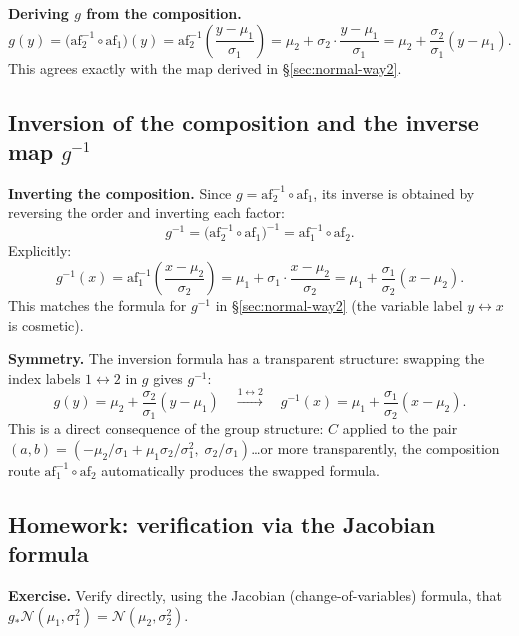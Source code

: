 \documentclass[11pt,a4paper]{article}
\newcommand{\N}{\mathcal{N}}
\begin{document}
\noindent\textbf{Deriving $g$ from the composition.}
\[
  g(y)
  = \bigl(\mathrm{af}_2^{-1}\circ\mathrm{af}_1\bigr)(y)
  = \mathrm{af}_2^{-1}\!\left(\frac{y-\mu_1}{\sigma_1}\right)
  = \mu_2 + \sigma_2\cdot\frac{y-\mu_1}{\sigma_1}
  = \mu_2 + \frac{\sigma_2}{\sigma_1}(y-\mu_1).
\]
This agrees exactly with the map derived in \S\ref{sec:normal-way2}. \checkmark

\subsection{Inversion of the composition and the inverse map $g^{-1}$}
\label{sec:g-inverse}

\noindent\textbf{Inverting the composition.}
Since $g=\mathrm{af}_2^{-1}\circ\mathrm{af}_1$, its inverse is obtained by reversing the
order and inverting each factor:
\[
  g^{-1}
  = \bigl(\mathrm{af}_2^{-1}\circ\mathrm{af}_1\bigr)^{-1}
  = \mathrm{af}_1^{-1}\circ\mathrm{af}_2.
\]
Explicitly:
\[
  g^{-1}(x)
  = \mathrm{af}_1^{-1}\!\left(\frac{x-\mu_2}{\sigma_2}\right)
  = \mu_1 + \sigma_1\cdot\frac{x-\mu_2}{\sigma_2}
  = \mu_1 + \frac{\sigma_1}{\sigma_2}(x-\mu_2).
\]
This matches the formula for $g^{-1}$ in \S\ref{sec:normal-way2} (the variable label
$y\leftrightarrow x$ is cosmetic). \checkmark

\noindent\textbf{Symmetry.}  The inversion formula has a transparent structure:
swapping the index labels $1\leftrightarrow 2$ in $g$ gives $g^{-1}$:
\[
  g(y)=\mu_2+\frac{\sigma_2}{\sigma_1}(y-\mu_1)
  \quad\xrightarrow{1\leftrightarrow 2}\quad
  g^{-1}(x)=\mu_1+\frac{\sigma_1}{\sigma_2}(x-\mu_2).
\]
This is a direct consequence of the group structure: $C$ applied to the pair
$(a,b)=(-\mu_2/\sigma_1+\mu_1\sigma_2/\sigma_1^2,\;\sigma_2/\sigma_1)$\ldots or more
transparently, the composition route $\mathrm{af}_1^{-1}\circ\mathrm{af}_2$ automatically
produces the swapped formula.

\subsection{Homework: verification via the Jacobian formula}
\label{sec:jacobian-hw}

\noindent\textbf{Exercise.}
Verify directly, using the Jacobian (change-of-variables) formula, that
$g_*\N(\mu_1,\sigma_1^2)=\N(\mu_2,\sigma_2^2)$.
\end{document}
